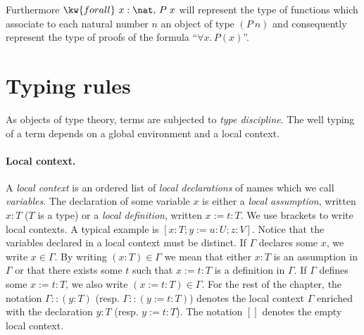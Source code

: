 Furthermore $\kw{forall}~x:\nat,\,P\;x$ will represent the type of
functions which associate to each natural number $n$ an object of type
$(P~n)$ and consequently represent the type of proofs of the formula
``$\forall x.\,P(x)$''.

\section[Typing rules]{Typing rules\label{Typed-terms}}

As objects of type theory, terms are subjected to {\em type
discipline}. The well typing of a term depends on
a global environment and a local context.

\paragraph{Local context.}
A {\em local context} is an ordered list of
{\em local declarations} of names which we call {\em variables}.
The declaration of some variable $x$ is
either a {\em local assumption}, written $x:T$ ($T$ is a type) or a {\em local definition},
written $x:=t:T$.  We use brackets to write local contexts. A
typical example is $[x:T;y:=u:U;z:V]$.  Notice that the variables
declared in a local context must be distinct. If $\Gamma$ declares some $x$,
we write $x \in \Gamma$. By writing $(x:T) \in \Gamma$ we mean that
either $x:T$ is an assumption in $\Gamma$ or that there exists some $t$ such
that $x:=t:T$ is a definition in $\Gamma$. If $\Gamma$ defines some
$x:=t:T$, we also write $(x:=t:T) \in \Gamma$.
For the rest of the chapter, the
notation $\Gamma::(y:T)$ (resp. $\Gamma::(y:=t:T)$) denotes the local context
$\Gamma$ enriched with the declaration $y:T$ (resp. $y:=t:T$). The
notation $[]$ denotes the empty local context.



